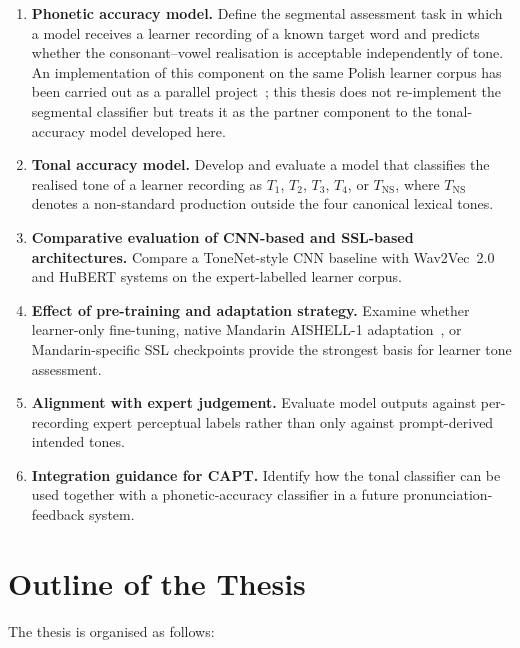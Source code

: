 \begin{enumerate}
  \item \textbf{Phonetic accuracy model.} Define the segmental assessment task in which a model receives a learner recording of a known target word and predicts whether the consonant--vowel realisation is acceptable independently of tone. An implementation of this component on the same Polish learner corpus has been carried out as a parallel project~\cite{brzeski2025mprp}; this thesis does not re-implement the segmental classifier but treats it as the partner component to the tonal-accuracy model developed here.
  \item \textbf{Tonal accuracy model.} Develop and evaluate a model that classifies the realised tone of a learner recording as \(T_1\), \(T_2\), \(T_3\), \(T_4\), or \(T_{\mathrm{NS}}\), where \(T_{\mathrm{NS}}\) denotes a non-standard production outside the four canonical lexical tones.
  \item \textbf{Comparative evaluation of CNN-based and SSL-based architectures.} Compare a ToneNet-style CNN baseline with Wav2Vec~2.0 and HuBERT systems on the expert-labelled learner corpus.
  \item \textbf{Effect of pre-training and adaptation strategy.} Examine whether learner-only fine-tuning, native Mandarin AISHELL-1 adaptation~\cite{bu2017aishell}, or Mandarin-specific SSL checkpoints provide the strongest basis for learner tone assessment.
  \item \textbf{Alignment with expert judgement.} Evaluate model outputs against per-recording expert perceptual labels rather than only against prompt-derived intended tones.
  \item \textbf{Integration guidance for CAPT.} Identify how the tonal classifier can be used together with a phonetic-accuracy classifier in a future pronunciation-feedback system.
\end{enumerate}

\section{Outline of the Thesis}
\label{sec:intro:outline}

The thesis is organised as follows:

